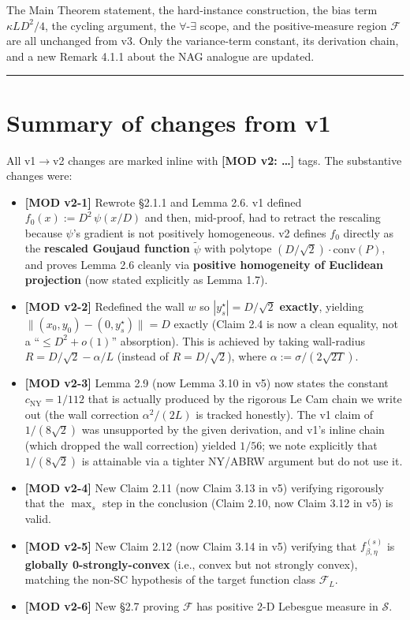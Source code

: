 \documentclass[11pt,a4paper]{article}
\theoremstyle{plain}
\theoremstyle{definition}
\theoremstyle{remark}
\newcommand{\conv}{\mathrm{conv}}
\newcommand{\F}{\mathcal{F}}
\newcommand{\Sset}{\mathcal{S}}
\begin{document}
The Main Theorem statement, the hard-instance construction, the bias term $\kappa LD^2/4$, the cycling argument, the $\forall$-$\exists$ scope, and the positive-measure region $\F$ are all unchanged from v3. Only the variance-term constant, its derivation chain, and a new Remark 4.1.1 about the NAG analogue are updated.

\bigskip
\hrule
\bigskip

\section*{Summary of changes from v1}

All v1$\to$v2 changes are marked inline with \textbf{[MOD v2: \ldots]} tags. The substantive changes were:

\begin{itemize}[leftmargin=*]
\item \textbf{[MOD v2-1]} Rewrote \S2.1.1 and Lemma 2.6. v1 defined $f_0(x) := D^2\,\psi(x/D)$ and then, mid-proof, had to retract the rescaling because $\psi$'s gradient is not positively homogeneous. v2 defines $f_0$ directly as the \textbf{rescaled Goujaud function} $\tilde\psi$ with polytope $(D/\sqrt 2)\cdot \conv(P)$, and proves Lemma 2.6 cleanly via \textbf{positive homogeneity of Euclidean projection} (now stated explicitly as Lemma 1.7).
\item \textbf{[MOD v2-2]} Redefined the wall $w$ so $|y^\star_s| = D/\sqrt 2$ \textbf{exactly}, yielding $\|(x_0, y_0) - (0, y^\star_s)\| = D$ exactly (Claim 2.4 is now a clean equality, not a ``$\leq D^2 + o(1)$'' absorption). This is achieved by taking wall-radius $R = D/\sqrt 2 - \alpha/L$ (instead of $R = D/\sqrt 2$), where $\alpha := \sigma/(2\sqrt{2T})$.
\item \textbf{[MOD v2-3]} Lemma 2.9 (now Lemma 3.10 in v5) now states the constant \textbf{$c_\mathrm{NY} = 1/112$} that is actually produced by the rigorous Le Cam chain we write out (the wall correction $\alpha^2/(2L)$ is tracked honestly). The v1 claim of $1/(8\sqrt 2)$ was unsupported by the given derivation, and v1's inline chain (which dropped the wall correction) yielded $1/56$; we note explicitly that $1/(8\sqrt 2)$ is attainable via a tighter NY/ABRW argument but do not use it.
\item \textbf{[MOD v2-4]} New Claim 2.11 (now Claim 3.13 in v5) verifying rigorously that the $\max_s$ step in the conclusion (Claim 2.10, now Claim 3.12 in v5) is valid.
\item \textbf{[MOD v2-5]} New Claim 2.12 (now Claim 3.14 in v5) verifying that $f_{\beta,\eta}^{(s)}$ is \textbf{globally 0-strongly-convex} (i.e., convex but not strongly convex), matching the non-SC hypothesis of the target function class $\mathcal{F}_L$.
\item \textbf{[MOD v2-6]} New \S2.7 proving $\F$ has positive 2-D Lebesgue measure in $\Sset$.
\end{itemize}
\end{document}
